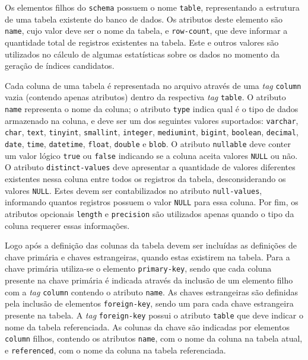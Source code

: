 Os elementos filhos do \texttt{schema} possuem o nome \texttt{table}, representando a estrutura de uma tabela existente do banco de dados. Os atributos deste elemento são \texttt{name}, cujo valor deve ser o nome da tabela, e \texttt{row-count}, que deve informar a quantidade total de registros existentes na tabela. Este e outros valores são utilizados no cálculo de algumas estatísticas sobre os dados no momento da geração de índices candidatos.

Cada coluna de uma tabela é representada no arquivo através de uma \textit{tag} \texttt{column} vazia (contendo apenas atributos) dentro da respectiva \textit{tag} \texttt{table}. O atributo \texttt{name} representa o nome da coluna; o atributo \texttt{type} indica qual é o tipo de dados armazenado na coluna, e deve ser um dos seguintes valores suportados: \texttt{varchar}, \texttt{char}, \texttt{text}, \texttt{tinyint}, \texttt{smallint}, \texttt{integer}, \texttt{mediumint}, \texttt{bigint}, \texttt{boolean}, \texttt{decimal}, \texttt{date}, \texttt{time}, \texttt{datetime}, \texttt{float}, \texttt{double} e \texttt{blob}. O atributo \texttt{nullable} deve conter um valor lógico \texttt{true} ou \texttt{false} indicando se a coluna aceita valores \texttt{NULL} ou não. O atributo \texttt{distinct-values} deve apresentar a quantidade de valores diferentes existentes nessa coluna entre todos os registros da tabela, desconsiderando os valores \texttt{NULL}. Estes devem ser contabilizados no atributo \texttt{null-values}, informando quantos registros possuem o valor \texttt{NULL} para essa coluna. Por fim, os atributos opcionais \texttt{length} e \texttt{precision} são utilizados apenas quando o tipo da coluna requerer essas informações.

Logo após a definição das colunas da tabela devem ser incluídas as definições de chave primária e chaves estrangeiras, quando estas existirem na tabela. Para a chave primária utiliza-se o elemento \texttt{primary-key}, sendo que cada coluna presente na chave primária é indicada através da inclusão de um elemento filho com a \textit{tag} \texttt{column} contendo o atributo \texttt{name}. As chaves estrangeiras são definidas pela inclusão de elementos \texttt{foreign-key}, sendo um para cada chave estrangeira presente na tabela. A \textit{tag} \texttt{foreign-key} possui o atributo \texttt{table} que deve indicar o nome da tabela referenciada. As colunas da chave são indicadas por elementos \texttt{column} filhos, contendo os atributos \texttt{name}, com o nome da coluna na tabela atual, e \texttt{referenced}, com o nome da coluna na tabela referenciada.

